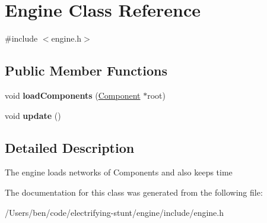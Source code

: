 \hypertarget{class_engine}{}\section{Engine Class Reference}
\label{class_engine}


{\ttfamily \#include $<$engine.\+h$>$}

\subsection*{Public Member Functions}
\begin{DoxyCompactItemize}
\item 
\hypertarget{class_engine_a85cc5eb34a32de8d204ff5562c21201a}{}void {\bfseries load\+Components} (\hyperlink{class_component}{Component} $\ast$root)\label{class_engine_a85cc5eb34a32de8d204ff5562c21201a}

\item 
\hypertarget{class_engine_ad2ff110d5a86c1cd60b541d65915ac48}{}void {\bfseries update} ()\label{class_engine_ad2ff110d5a86c1cd60b541d65915ac48}

\end{DoxyCompactItemize}


\subsection{Detailed Description}
The engine loads networks of Components and also keeps time 

The documentation for this class was generated from the following file\+:\begin{DoxyCompactItemize}
\item 
/\+Users/ben/code/electrifying-\/stunt/engine/include/engine.\+h\end{DoxyCompactItemize}
